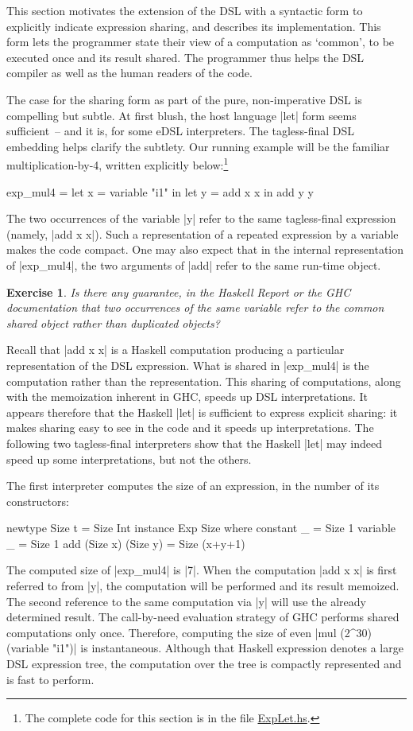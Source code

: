\documentclass[submission,copyright,creativecommons]{eptcs}
\newtheorem{Exercise}{Exercise} \newcommand\aside[1]{}
\begin{document}
This section motivates the extension of the DSL with a syntactic form
to explicitly indicate expression sharing, and describes its
implementation. This form lets the programmer state their view of a
computation as `common', to be executed once and its result
shared. The programmer thus helps the DSL compiler as well as the human
readers of the code.

The case for the sharing form as part of the pure, non-imperative DSL is
compelling but subtle. At first blush, the
host language |let| form seems sufficient~-- and it is, for some eDSL
interpreters. The tagless-final DSL embedding helps clarify the
subtlety. Our running example will be the familiar
multiplication-by-4, written explicitly below:\footnote{
The complete code for this section is in the file \url{ExpLet.hs}.}
\begin{code}
exp_mul4 = 
 let x = variable "i1" in
 let y = add x x in
 add y y
\end{code}
The two occurrences of the variable |y| refer to the same
tagless-final expression (namely, |add x x|). Such a representation of
a repeated expression by a variable makes the code compact. 
One may also expect that in the internal representation of |exp_mul4|,
the two arguments of |add| refer to the same run-time object.
\begin{Exercise}
Is there any guarantee, in the Haskell Report or the GHC documentation
that two occurrences of the same variable refer to the common shared
object rather than duplicated objects?
\end{Exercise}
Recall that |add x x| is a Haskell computation producing a particular
representation of the DSL expression. What is shared in |exp_mul4| is
the computation rather than the representation. This sharing of
computations, along with the memoization inherent in GHC, speeds up
DSL interpretations. It appears therefore that the Haskell |let| is
sufficient to express explicit sharing: it makes sharing easy to
see in the code and it speeds up interpretations.  The following two
tagless-final interpreters show that the Haskell |let| may indeed
speed up some interpretations, but not the others.

The first interpreter computes the size of an expression, in
the number of its constructors:
\begin{code}
newtype Size t = Size Int
instance Exp Size where
    constant _ = Size 1
    variable _ = Size 1
    add (Size x) (Size y) = Size (x+y+1)
\end{code}
The computed size of |exp_mul4| is |7|. When the computation |add x x|
is first referred to from |y|, the computation will be performed and
its result memoized. The second reference to the same computation via
|y| will use the already determined result. The call-by-need evaluation
strategy of GHC performs shared computations only once. Therefore,
computing the size of even |mul (2^30) (variable "i1")| is
instantaneous. Although that Haskell expression denotes a large DSL
expression tree, the computation over the tree is compactly
represented and is fast to perform.
\end{document}
